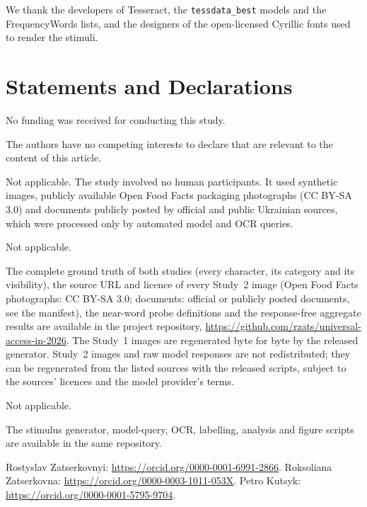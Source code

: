 \backmatter


We thank the developers of Tesseract, the \texttt{tessdata\_best} models and the FrequencyWords lists, and the designers of the open-licensed Cyrillic fonts used to render the stimuli.

\section*{Statements and Declarations}

No funding was received for conducting this study.

The authors have no competing interests to declare that are relevant to the content of this article.

Not applicable. The study involved no human participants. It used synthetic images, publicly available Open Food Facts packaging photographs (CC BY-SA 3.0) and documents publicly posted by official and public Ukrainian sources, which were processed only by automated model and OCR queries.

Not applicable.

The complete ground truth of both studies (every character, its category and its visibility), the source URL and licence of every Study~2 image (Open Food Facts photographs: CC BY-SA 3.0; documents: official or publicly posted documents, see the manifest), the near-word probe definitions and the response-free aggregate results are available in the project repository, \url{https://github.com/rzats/universal-access-in-2026}. The Study~1 images are regenerated byte for byte by the released generator. Study~2 images and raw model responses are not redistributed; they can be regenerated from the listed sources with the released scripts, subject to the sources' licences and the model provider's terms.

Not applicable.

The stimulus generator, model-query, OCR, labelling, analysis and figure scripts are available in the same repository.

Rostyslav Zatserkovnyi: \url{https://orcid.org/0000-0001-6991-2866}. Roksoliana Zatserkovna: \url{https://orcid.org/0000-0003-1011-053X}. Petro Kutsyk: \url{https://orcid.org/0000-0001-5795-9704}.

